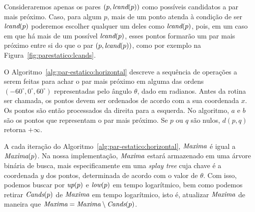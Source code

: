 

Consideraremos apenas os pares $(p, \textit{lcand}(p))$ como possíveis candidatos a par mais próximo.
Caso, para algum $p$, mais de um ponto atenda à condição de ser $\textit{lcand}(p)$ poderemos escolher
qualquer um deles como $\textit{lcand}(p)$, pois, em um caso em que há mais de um possível $\textit{lcand}(p)$,
esses pontos formarão um par mais próximo entre si do que o par $(p, \textit{lcand}(p))$, como por exemplo
na Figura~\ref{fig:parestatico:lcands}.



O Algoritmo~\ref{alg:par-estatico:horizontal} descreve a sequência de operações a serem feitas para
achar o par mais próximo em alguma das ordens $(-60^\circ, 0^\circ, 60^\circ)$ representadas pelo
ângulo $\theta$, dado em radianos.
Antes da rotina ser chamada, os pontos devem ser ordenados de acordo com a sua coordenada $x$.
Os pontos são então processados da direita para a esquerda.
No algoritmo, $a$ e $b$ são os pontos que representam o par mais próximo.
Se $p$ ou $q$ são nulos, $d(p,q)$ retorna $+\infty$.

A cada iteração do Algoritmo~\ref{alg:par-estatico:horizontal}, $\textit{Maxima}$ é igual a $\textit{Maxima}(p)$.
Na nossa implementação, $\textit{Maxima}$ estará armazenado em uma árvore binária de busca, mais
especificamente em uma \textit{splay tree} cuja chave é a coordenada $y$ dos pontos, determinada
de acordo com o valor de $\theta$.
Com isso, podemos buscar por $\textit{up}(p)$ e $\textit{low}(p)$ em tempo logarítmico, bem como podemos retirar
$\textit{Cands}(p)$ de $\textit{Maxima}$ em tempo logarítmico, isto é, atualizar $\textit{Maxima}$ de maneira que $\textit{Maxima}
= \textit{Maxima} \setminus \textit{Cands}(p)$.



